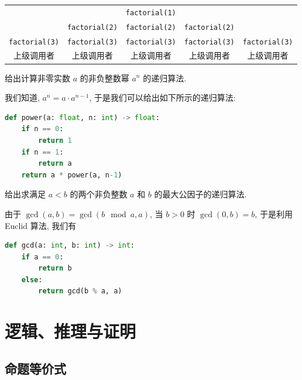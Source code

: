\documentclass[10pt,UTF8]{book} %
\begin{document}
\begin{example}
\begin{sol}
{\begin{longtable}{|c|c|c|c|c|}
            && \lstinline|factorial(1)| && \\ 
            & \lstinline|factorial(2)| & \lstinline|factorial(2)| & \lstinline|factorial(2)| & \\ 
            \lstinline|factorial(3)| & \lstinline|factorial(3)| & \lstinline|factorial(3)| & \lstinline|factorial(3)| & \lstinline|factorial(3)| \\
            上级调用者 & 上级调用者 & 上级调用者 & 上级调用者 & 上级调用者 \\
            \hline
        \end{longtable}}
    \end{sol}
\end{example}

\begin{example}
    给出计算非零实数 $a$ 的非负整数幂 $a^n$ 的递归算法.
    \begin{sol}
        我们知道, $a^n = a \cdot a^{n-1}$, 于是我们可以给出如下所示的递归算法:
\begin{lstlisting}[language=Python]
def power(a: float, n: int) -> float:
    if n == 0:
        return 1
    if n == 1:
        return a
    return a * power(a, n-1)
\end{lstlisting}
    \end{sol}
\end{example}

\begin{example}
    给出求满足 $a<b$ 的两个非负整数 $a$ 和 $b$ 的最大公因子的递归算法.
    \begin{sol}
        由于 $\gcd(a,b) = \gcd(b \mod a, a)$, 当 $b>0$ 时 $\gcd(0, b) = b$,
        于是利用 Euclid 算法, 我们有
\begin{lstlisting}[language=Python]
def gcd(a: int, b: int) -> int:
    if a == 0:
        return b
    else:
        return gcd(b % a, a)
\end{lstlisting}
    \end{sol}
\end{example}

\chapter{逻辑、推理与证明}


\section{命题等价式}
\end{document}
